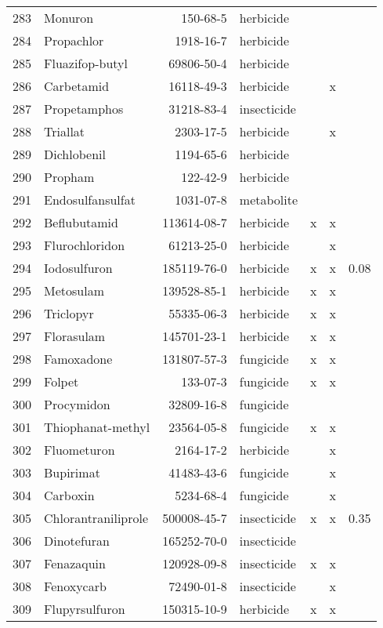 \begin{longtable}{lp{3cm}rlp{0.5cm}p{0.5cm}p{1cm}}
  283 & Monuron & 150-68-5 & herbicide &  &  &  \\ 
  284 & Propachlor & 1918-16-7 & herbicide &  &  &  \\ 
  285 & Fluazifop-butyl & 69806-50-4 & herbicide &  &  &  \\ 
  286 & Carbetamid & 16118-49-3 & herbicide &  & x &  \\ 
  287 & Propetamphos & 31218-83-4 & insecticide &  &  &  \\ 
  288 & Triallat & 2303-17-5 & herbicide &  & x &  \\ 
  289 & Dichlobenil & 1194-65-6 & herbicide &  &  &  \\ 
  290 & Propham & 122-42-9 & herbicide &  &  &  \\ 
  291 & Endosulfansulfat & 1031-07-8 & metabolite &  &  &  \\ 
  292 & Beflubutamid & 113614-08-7 & herbicide & x & x &  \\ 
  293 & Flurochloridon & 61213-25-0 & herbicide &  & x &  \\ 
  294 & Iodosulfuron & 185119-76-0 & herbicide & x & x & 0.08 \\ 
  295 & Metosulam & 139528-85-1 & herbicide & x & x &  \\ 
  296 & Triclopyr & 55335-06-3 & herbicide & x & x &  \\ 
  297 & Florasulam & 145701-23-1 & herbicide & x & x &  \\ 
  298 & Famoxadone & 131807-57-3 & fungicide & x & x &  \\ 
  299 & Folpet & 133-07-3 & fungicide & x & x &  \\ 
  300 & Procymidon & 32809-16-8 & fungicide &  &  &  \\ 
  301 & Thiophanat-methyl & 23564-05-8 & fungicide & x & x &  \\ 
  302 & Fluometuron & 2164-17-2 & herbicide &  & x &  \\ 
  303 & Bupirimat & 41483-43-6 & fungicide &  & x &  \\ 
  304 & Carboxin & 5234-68-4 & fungicide &  & x &  \\ 
  305 & Chlorantraniliprole & 500008-45-7 & insecticide & x & x & 0.35 \\ 
  306 & Dinotefuran & 165252-70-0 & insecticide &  &  &  \\ 
  307 & Fenazaquin & 120928-09-8 & insecticide & x & x &  \\ 
  308 & Fenoxycarb & 72490-01-8 & insecticide &  & x &  \\ 
  309 & Flupyrsulfuron & 150315-10-9 & herbicide & x & x &  \\ 

\end{longtable}
